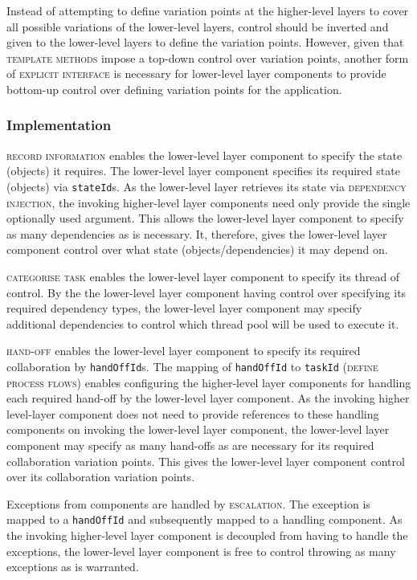 \documentclass[prodmode]{style/acmlarge}
\begin{document}
Instead of attempting to define variation points at the higher-level layers to
cover all possible variations of the lower-level layers, control should be
inverted and given to the lower-level layers to define the variation points. 
However, given that \textsc{template methods} impose a top-down control over
variation points, another form of \textsc{explicit interface} is necessary for
lower-level layer components to provide bottom-up control over defining
variation points for the application.



\subsubsection*{Implementation}

\textsc{record information} \cite{ioc} enables the lower-level layer component
to specify the state (objects) it requires.  The lower-level layer component
specifies its required state (objects) via \texttt{stateId}s.  As the
lower-level layer retrieves its state via \textsc{dependency injection}, the
invoking higher-level layer components need only provide the single optionally
used argument.  This allows the lower-level layer component to specify as many
dependencies as is necessary.  It, therefore, gives the lower-level layer
component control over what state (objects/dependencies) it may depend on.

\textsc{categorise task} enables the lower-level layer component to specify its
thread of control.  By the the lower-level layer component having control over
specifying its required dependency types, the lower-level layer component may
specify additional dependencies to control which thread pool will be used to
execute it.

\textsc{hand-off} enables the lower-level layer component to specify its
required collaboration by \texttt{handOffId}s.  The mapping of
\texttt{handOffId} to \texttt{taskId} (\textsc{define process flows}) enables
configuring the higher-level layer components for handling each required
hand-off by the lower-level layer component.  As the invoking higher level-layer
component does not need to provide references to these handling components on
invoking the lower-level layer component, the lower-level layer component may
specify as many hand-offs as are necessary for its required collaboration
variation points.  This gives the lower-level layer component control over its
collaboration variation points.

Exceptions from components are handled by \textsc{escalation}.  The
exception is mapped to a \texttt{handOffId} and subsequently mapped to a
handling component.  As the invoking higher-level layer component is decoupled
from having to handle the exceptions, the lower-level layer component is free to
control throwing as many exceptions as is warranted.
\end{document}
